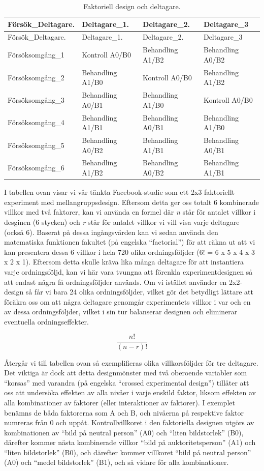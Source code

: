 \documentclass[
]{book}
\begin{document}
\begin{longtable}[]{@{}llll@{}}
\caption{\label{tab:tab-02-07-5-6-02}Faktoriell design och deltagare.}\tabularnewline
\toprule
Försök\_Deltagare. & Deltagare\_1. & Deltagare\_2. & Deltagare\_3\tabularnewline
\midrule
\endfirsthead
\toprule
Försök\_Deltagare. & Deltagare\_1. & Deltagare\_2. & Deltagare\_3\tabularnewline
\midrule
\endhead
Försöksomgång\_1 & Kontroll A0/B0 & Behandling A1/B2 & Behandling A0/B2\tabularnewline
Försöksomgång\_2 & Behandling A1/B0 & Kontroll A0/B0 & Behandling A1/B2\tabularnewline
Försöksomgång\_3 & Behandling A0/B1 & Behandling A1/B0 & Kontroll A0/B0\tabularnewline
Försöksomgång\_4 & Behandling A1/B1 & Behandling A0/B1 & Behandling A1/B0\tabularnewline
Försöksomgång\_5 & Behandling A0/B2 & Behandling A1/B1 & Behandling A0/B1\tabularnewline
Försöksomgång\_6 & Behandling A1/B2 & Behandling A0/B2 & Behandling A1/B1\tabularnewline
\bottomrule
\end{longtable}

I tabellen ovan visar vi vår tänkta Facebook-studie som ett 2x3 faktoriellt experiment med mellangruppsdesign. Eftersom detta ger oss totalt 6 kombinerade villkor med två faktorer, kan vi använda en formel där \emph{n} står för antalet villkor i desginen (6 stycken) och \emph{r} står för antalet villkor vi vill visa varje deltagare (också 6). Baserat på dessa ingångsvärden kan vi sedan använda den matematiska funktionen fakultet (på engelska ``factorial'') för att räkna ut att vi kan presentera dessa 6 villkor i hela 720 olika ordningsföljder (6! = 6 x 5 x 4 x 3 x 2 x 1). Eftersom detta skulle kräva lika många deltagare för att instantiera varje ordningsföljd, kan vi här vara tvungna att förenkla experimentdesignen så att endast några få ordningsföljder används. Om vi istället använder en 2x2-design så får vi bara 24 olika ordningsföljder, vilket gör det betydligt lättare att föräkra oss om att några deltagare genomgår experimentets villkor i var och en av dessa ordningsföljder, vilket i sin tur balanserar designen och eliminerar eventuella ordningseffekter.

\begin{equation}
    \frac{n!}{(n-r)!}
\label{eq:permutationswithoutrepetition}
\end{equation}

Återgår vi till tabellen ovan så exemplifieras olika villkorsföljder för tre deltagare. Det viktiga är dock att detta designmönster med två oberoende variabler som ``korsas'' med varandra (på engelska ``crossed experimental design'') tillåter att oss att undersöka effekten av alla nivåer i varje enskild faktor, liksom effekten av alla kombinationer av faktorer (eller interaktioner av faktorer). I exemplet benämns de båda faktorerna som A och B, och nivåerna på respektive faktor numreras från 0 och uppåt. Kontrollvillkoret i den faktoriella designen utgörs av kombinationen av ``bild på neutral person'' (A0) och ``liten bildstorlek'' (B0), därefter kommer nästa kombinerade villkor ``bild på auktoritetsperson'' (A1) och ``liten bildstorlek'' (B0), och därefter kommer villkoret ``bild på neutral person'' (A0) och ``medel bildstorlek'' (B1), och så vidare för alla kombinationer.
\end{document}
